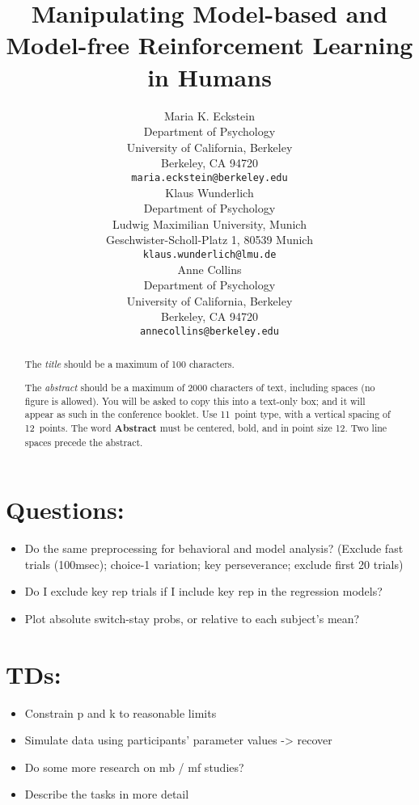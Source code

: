 \documentclass[11pt]{article} %
\title{Manipulating Model-based and Model-free Reinforcement Learning in Humans}
\author{
Maria K. Eckstein \\
Department of Psychology \\
University of California, Berkeley \\
Berkeley, CA 94720 \\
\texttt{maria.eckstein@berkeley.edu} \\
\And
Klaus Wunderlich \\
Department of Psychology \\
Ludwig Maximilian University, Munich \\
Geschwister-Scholl-Platz 1, 80539 Munich \\
\texttt{klaus.wunderlich@lmu.de} \\
\And
Anne Collins \\
Department of Psychology\\
University of California, Berkeley \\
Berkeley, CA 94720  \\
\texttt{annecollins@berkeley.edu} \\
}
\begin{document}
\maketitle

\begin{abstract}
The \emph{title} should be a maximum of 100 characters. 

The \emph{abstract} should be a maximum of 2000 characters of text,
including spaces (no figure is allowed). You will be asked to copy
this into a text-only box; and it will appear as such in the
conference booklet. Use 11~point type, with a vertical spacing of
12~points.  The word \textbf{Abstract} must be centered, bold, and in
point size 12. Two line spaces precede the abstract.
\end{abstract}




\section{Questions:}
\begin{itemize}
	\item Do the same preprocessing for behavioral and model analysis? (Exclude fast trials (100msec); choice-1 variation; key perseverance; exclude first 20 trials)
	\item Do I exclude key rep trials if I include key rep in the regression models?
	\item Plot absolute switch-stay probs, or relative to each subject's mean?
\end{itemize}

\section{TDs:}
\begin{itemize}
	\item Constrain p and k to reasonable limits
	\item Simulate data using participants' parameter values -> recover
	\item Do some more research on mb / mf studies?
	\item Describe the tasks in more detail
\end{itemize}
\end{document}
